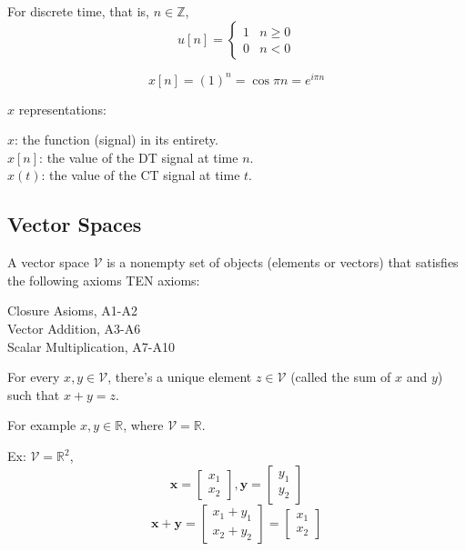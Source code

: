 \documentclass{article}
\begin{document}
\begin{definition}
For discrete time, that is, $n \in \mathbb{Z}$,
$$ u[n] = \begin{cases}
    1 & n \geq 0 \\
    0 & n < 0
\end{cases} $$
\end{definition}

\begin{definition}
  $$ x[n] = (1)^n = \cos{\pi n} = e^{i \pi n} $$
\end{definition}

$x$ representations:

$x$: the function (signal) in its entirety.\\
$x[n]$: the value of the DT signal at time $n$.\\
$x(t)$: the value of the CT signal at time $t$.

\subsection{Vector Spaces}

A vector space $\mathcal{V}$ is a nonempty set of objects
(elements or vectors) that satisfies the following axioms TEN axioms:

Closure Asioms, A1-A2 \\
Vector Addition, A3-A6 \\
Scalar Multiplication, A7-A10

\begin{definition}
  For every $x, y \in \mathcal{V}$, there's a unique element $z \in \mathcal{V}$ 
  (called the sum of $x$ and $y$) such that $x + y = z$.
\end{definition}

For example $x,y \in \mathbb{R}$, where $\mathcal{V} = \mathbb{R}$.

Ex:
$\mathcal{V} = \mathbb{R}^2$,
$$ \bm{x} = \begin{bmatrix} x_1 \\ x_2 \end{bmatrix}, \bm{y} = \begin{bmatrix} y_1 \\ y_2 \end{bmatrix} $$
$$ \bm{x} + \bm{y} = \begin{bmatrix} x_1 + y_1 \\ x_2 + y_2 \end{bmatrix}
= \begin{bmatrix} x_1 \\ x_2 \end{bmatrix} $$
\end{document}
